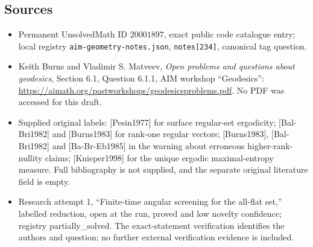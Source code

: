\documentclass[11pt]{article}
\begin{document}
\subsection{Sources}
\begin{itemize}
\item Permanent UnsolvedMath ID \(20001897\), exact public code catalogue entry; local registry \texttt{aim-geometry-notes.json}, \texttt{notes[234]}, canonical tag question.
\item Keith Burns and Vladimir S. Matveev, \emph{Open problems and questions about geodesics}, Section 6.1, Question 6.1.1, AIM workshop ``Geodesics'': \url{https://aimath.org/pastworkshops/geodesicsproblems.pdf}. No PDF was accessed for this draft.
\item Supplied original labels: [Pesin1977] for surface regular-set ergodicity; [Bal-Bri1982] and [Burns1983] for rank-one regular vectors; [Burns1983], [Bal-Bri1982] and [Ba-Br-Eb1985] in the warning about erroneous higher-rank-nullity claims; [Knieper1998] for the unique ergodic maximal-entropy measure. Full bibliography is not supplied, and the separate original literature field is empty.
\item Research attempt 1, ``Finite-time angular screening for the all-flat set,'' labelled reduction, open at the run, proved and low novelty confidence; registry partially\_solved. The exact-statement verification identifies the authors and question; no further external verification evidence is included.
\end{itemize}
\end{document}
